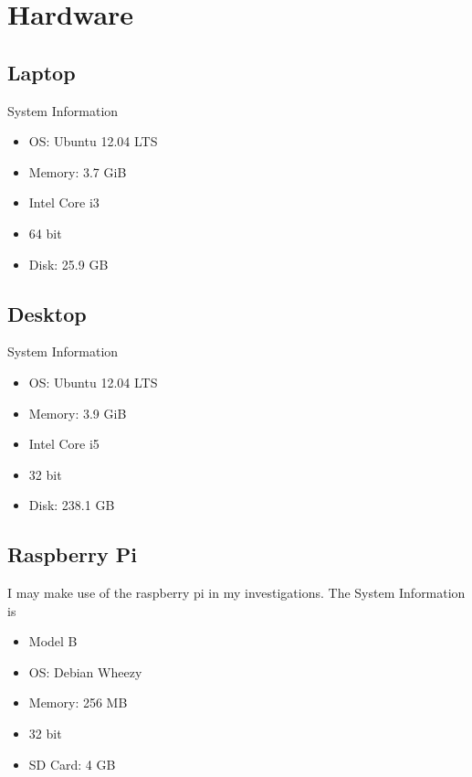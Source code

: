 \documentclass[12pt,a4paper,oneside]{article}
\begin{document}
\section{Hardware} 

\subsection{Laptop}
System Information
\begin{itemize}
\item OS: Ubuntu 12.04 LTS
\item Memory: 3.7 GiB
\item Intel Core i3
\item 64 bit
\item Disk: 25.9 GB
\end{itemize}

\subsection{Desktop}
System Information
\begin{itemize}
\item OS: Ubuntu 12.04 LTS
\item Memory: 3.9 GiB
\item Intel Core i5
\item 32 bit
\item Disk: 238.1 GB
\end{itemize}

\subsection{Raspberry Pi}
I may make use of the raspberry pi in my investigations. The System Information is
\begin{itemize}
\item Model B
\item OS: Debian Wheezy
\item Memory: 256 MB
\item 32 bit
\item SD Card: 4 GB
\end{itemize}
\end{document}
